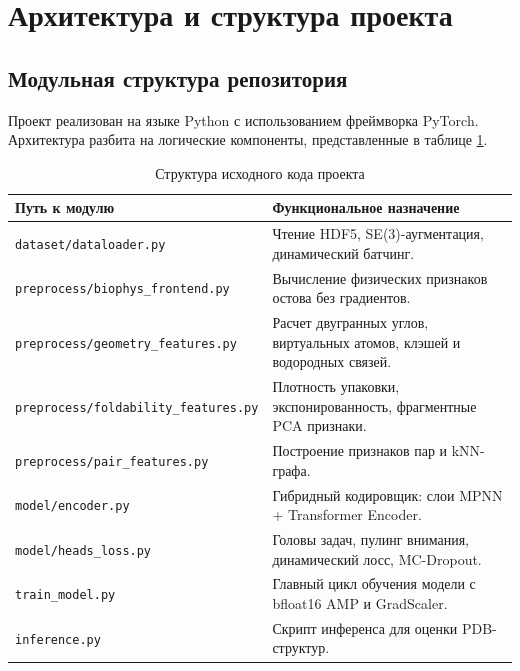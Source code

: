 \documentclass[12pt, a4paper]{article}
\begin{document}
\newpage

\section{Архитектура и структура проекта}

\subsection{Модульная структура репозитория}
Проект реализован на языке Python с использованием фреймворка PyTorch. Архитектура разбита на логические компоненты, представленные в таблице \ref{tab:structure}.

\begin{table}[h]
\centering
\caption{Структура исходного кода проекта}
\label{tab:structure}
\begin{tabular}{p{5.5cm}p{9.5cm}}
\toprule
\textbf{Путь к модулю} & \textbf{Функциональное назначение} \\
\midrule
\raggedright\texttt{dataset/\allowbreak dataloader.py} & Чтение HDF5, SE(3)-аугментация, динамический батчинг. \\
\raggedright\texttt{preprocess/\allowbreak biophys\_\allowbreak frontend.py} & Вычисление физических признаков остова без градиентов. \\
\raggedright\texttt{preprocess/\allowbreak geometry\_\allowbreak features.py} & Расчет двугранных углов, виртуальных атомов, клэшей и водородных связей. \\
\raggedright\texttt{preprocess/\allowbreak foldability\_\allowbreak features.py} & Плотность упаковки, экспонированность, фрагментные PCA признаки. \\
\raggedright\texttt{preprocess/\allowbreak pair\_\allowbreak features.py} & Построение признаков пар и kNN-графа. \\
\raggedright\texttt{model/\allowbreak encoder.py} & Гибридный кодировщик: слои MPNN + Transformer Encoder. \\
\raggedright\texttt{model/\allowbreak heads\_\allowbreak loss.py} & Головы задач, пулинг внимания, динамический лосс, MC-Dropout. \\
\raggedright\texttt{train\_model.py} & Главный цикл обучения модели с bfloat16 AMP и GradScaler. \\
\raggedright\texttt{inference.py} & Скрипт инференса для оценки PDB-структур. \\
\bottomrule
\end{tabular}
\end{table}
\end{document}
